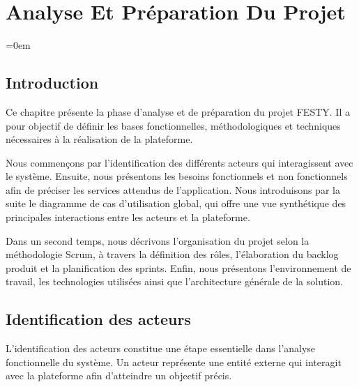 \chapter{Analyse Et Préparation Du Projet}
\begingroup
\parindent=0em
\localtableofcontents
\endgroup
\newpage

\section{Introduction}
Ce chapitre présente la phase d’analyse et de préparation du projet FESTY. Il a pour objectif de définir les bases fonctionnelles, méthodologiques et techniques nécessaires à la réalisation de la plateforme.

Nous commençons par l’identification des différents acteurs qui interagissent avec le système. Ensuite, nous présentons les besoins fonctionnels et non fonctionnels afin de préciser les services attendus de l’application. Nous introduisons par la suite le diagramme de cas d’utilisation global, qui offre une vue synthétique des principales interactions entre les acteurs et la plateforme.

Dans un second temps, nous décrivons l’organisation du projet selon la méthodologie Scrum, à travers la définition des rôles, l’élaboration du backlog produit et la planification des sprints. Enfin, nous présentons l’environnement de travail, les technologies utilisées ainsi que l’architecture générale de la solution.

\section{Identification des acteurs}
L’identification des acteurs constitue une étape essentielle dans l’analyse fonctionnelle du système. Un acteur représente une entité externe qui interagit avec la plateforme afin d’atteindre un objectif précis.

